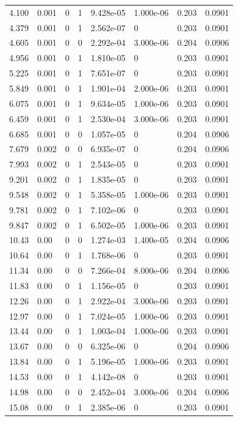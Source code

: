 \documentclass[preview]{standalone}
\begin{document}
{{\begin{tabular}{L{1.2cm}C{1.2cm} C{0.3cm}C{0.5cm} C{1.4cm}C{1.4cm} C{1.4cm}C{1.4cm}}
  4.100  &  0.001  & 0     &  1 &  9.428e-05  & 1.000e-06  & 0.203 &  0.0901   \\ 
  4.379  &  0.001  & 0     &  1 &  2.562e-07  & 0  & 0.203 &  0.0901   \\ 
  4.605  &  0.001  & 0     &  0 &  2.292e-04  & 3.000e-06  & 0.204 &  0.0906   \\ 
  4.956  &  0.001  & 0     &  1 &  1.810e-05  & 0  & 0.203 &  0.0901   \\ 
  5.225  &  0.001  & 0     &  1 &  7.651e-07  & 0  & 0.203 &  0.0901   \\ 
  5.849  &  0.001  & 0     &  1 &  1.901e-04  & 2.000e-06  & 0.203 &  0.0901   \\ 
  6.075  &  0.001  & 0     &  1 &  9.634e-05  & 1.000e-06  & 0.203 &  0.0901   \\ 
  6.459  &  0.001  & 0     &  1 &  2.530e-04  & 3.000e-06  & 0.203 &  0.0901   \\ 
  6.685  &  0.001  & 0     &  0 &  1.057e-05  & 0  & 0.204 &  0.0906   \\ 
  7.679  &  0.002  & 0     &  0 &  6.935e-07  & 0  & 0.204 &  0.0906   \\ 
  7.993  &  0.002  & 0     &  1 &  2.543e-05  & 0  & 0.203 &  0.0901   \\ 
  9.201  &  0.002  & 0     &  1 &  1.835e-05  & 0  & 0.203 &  0.0901   \\ 
  9.548  &  0.002  & 0     &  1 &  5.358e-05  & 1.000e-06  & 0.203 &  0.0901   \\ 
  9.781  &  0.002  & 0     &  1 &  7.102e-06  & 0  & 0.203 &  0.0901   \\ 
  9.847  &  0.002  & 0     &  1 &  6.502e-05  & 1.000e-06  & 0.203 &  0.0901   \\ 
  10.43  &  0.00  & 0     &  0 &  1.274e-03  & 1.400e-05  & 0.204 &  0.0906   \\ 
  10.64  &  0.00  & 0     &  1 &  1.768e-06  & 0  & 0.203 &  0.0901   \\ 
  11.34  &  0.00  & 0     &  0 &  7.266e-04  & 8.000e-06  & 0.204 &  0.0906   \\ 
  11.83  &  0.00  & 0     &  1 &  1.156e-05  & 0  & 0.203 &  0.0901   \\ 
  12.26  &  0.00  & 0     &  1 &  2.922e-04  & 3.000e-06  & 0.203 &  0.0901   \\ 
  12.97  &  0.00  & 0     &  1 &  7.024e-05  & 1.000e-06  & 0.203 &  0.0901   \\ 
  13.44  &  0.00  & 0     &  1 &  1.003e-04  & 1.000e-06  & 0.203 &  0.0901   \\ 
  13.67  &  0.00  & 0     &  0 &  6.325e-06  & 0  & 0.204 &  0.0906   \\ 
  13.84  &  0.00  & 0     &  1 &  5.196e-05  & 1.000e-06  & 0.203 &  0.0901   \\ 
  14.53  &  0.00  & 0     &  1 &  4.142e-08  & 0  & 0.203 &  0.0901   \\ 
  14.98  &  0.00  & 0     &  0 &  2.452e-04  & 3.000e-06  & 0.204 &  0.0906   \\ 
  15.08  &  0.00  & 0     &  1 &  2.385e-06  & 0  & 0.203 &  0.0901   \\ 
\hline 
\end{tabular} 

}}
\end{document}
